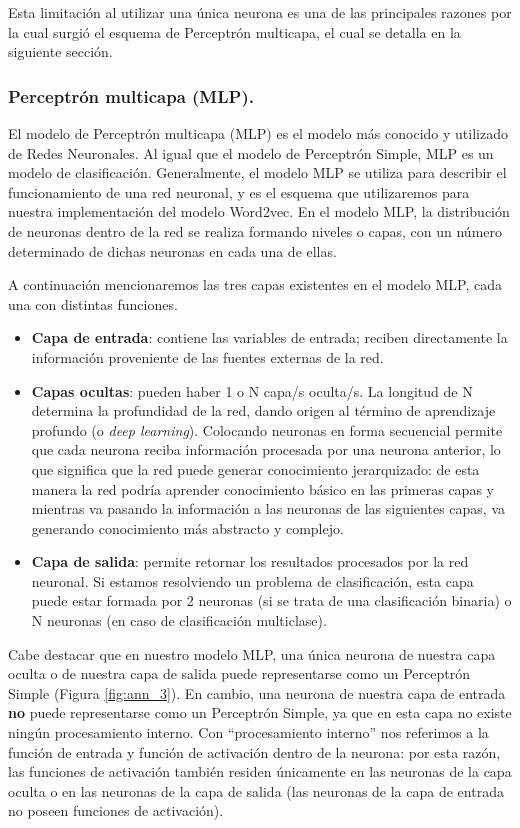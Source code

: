\documentclass[12pt,a4paper]{article}
\begin{document}
\begin{sloppypar}
Esta limitación al utilizar una única neurona es una de las principales razones por la cual surgió el esquema de Perceptrón multicapa, el cual se detalla en la siguiente sección.

\subsubsection{Perceptrón multicapa (MLP).}

El modelo de Perceptrón multicapa (MLP) es el modelo más conocido y utilizado de Redes Neuronales. Al igual que el modelo de Perceptrón Simple, MLP es un modelo de clasificación. Generalmente, el modelo MLP se utiliza para describir el funcionamiento de una red neuronal, y es el esquema que utilizaremos para nuestra implementación del modelo Word2vec. En el modelo MLP, la distribución de neuronas dentro de la red se realiza formando niveles o capas, con un número determinado de dichas neuronas en cada una de ellas. 

A continuación mencionaremos las tres capas existentes en el modelo MLP, cada una con distintas funciones.
\begin{itemize}
\item \textbf{Capa de entrada}: contiene las variables de entrada; reciben directamente la información proveniente de las fuentes externas de la red.
\item \textbf{Capas ocultas}: pueden haber 1 o N capa/s oculta/s. La longitud de N determina la profundidad de la red, dando origen al término de aprendizaje profundo (o \textit{deep learning}). Colocando neuronas en forma secuencial permite que cada neurona reciba información procesada por una neurona anterior, lo que significa que la red puede generar conocimiento jerarquizado: de esta manera la red podría aprender conocimiento básico en las primeras capas y mientras va pasando la información a las neuronas de las siguientes capas, va generando conocimiento más abstracto y complejo.
\item \textbf{Capa de salida}: permite retornar los resultados procesados por la red neuronal. Si estamos resolviendo un problema de clasificación, esta capa puede estar formada por 2 neuronas (si se trata de una clasificación binaria) o N neuronas (en caso de clasificación multiclase). 
\end{itemize}

Cabe destacar que en nuestro modelo MLP, una única neurona de nuestra capa oculta o de nuestra capa de salida puede representarse como un Perceptrón Simple (Figura \ref{fig:ann_3}). En cambio, una neurona de nuestra capa de entrada \textbf{no} puede representarse como un Perceptrón Simple, ya que en esta capa no existe ningún procesamiento interno. Con “procesamiento interno” nos referimos a la función de entrada y función de activación dentro de la neurona: por esta razón, las funciones de activación también residen únicamente en las neuronas de la capa oculta o en las neuronas de la capa de salida (las neuronas de la capa de entrada no poseen funciones de activación). 


\end{sloppypar}
\end{document}
